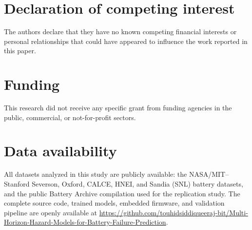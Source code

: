 \documentclass[preprint,12pt]{elsarticle}
\begin{document}
\section*{Declaration of competing interest}
The authors declare that they have no known competing financial interests or personal relationships that could have appeared to influence the work reported in this paper.

\section*{Funding}
This research did not receive any specific grant from funding agencies in the public, commercial, or not-for-profit sectors.

\section*{Data availability}
All datasets analyzed in this study are publicly available: the NASA/MIT--Stanford Severson, Oxford, CALCE, HNEI, and Sandia (SNL) battery datasets, and the public Battery Archive compilation used for the replication study. The complete source code, trained models, embedded firmware, and validation pipeline are openly available at \url{https://github.com/touhidsiddiqueeraj-bit/Multi-Horizon-Hazard-Models-for-Battery-Failure-Prediction}.

\raggedbottom
\clearpage
\end{document}
